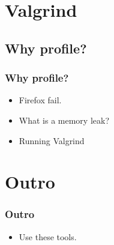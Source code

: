 \documentclass{beamer}
\begin{document}
\section {Valgrind}
\subsection{Why profile?}
\frame
{
    \frametitle{Why profile?}

    \begin{itemize}
        \item Firefox fail.
        \item What is a memory leak?
        \item Running Valgrind
    \end{itemize}
}

\section{Outro}
\frame
{
    \frametitle{Outro}

    \begin{itemize}
        \item Use these tools.
    \end{itemize}
}
\end{document}
